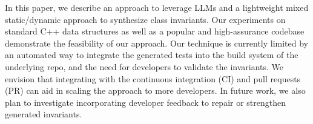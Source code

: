 In this paper, we describe an approach to leverage LLMs and a lightweight mixed static/dynamic approach to synthesize class invariants. 
Our experiments on standard C++ data structures as well as a popular and high-assurance codebase demonstrate the feasibility of our approach.
Our technique is currently limited by an automated way to integrate the generated tests into the build system of the underlying repo, and the need for developers to validate the invariants.
We envision that integrating \tech with the continuous integration (CI) and pull requests (PR) can aid in scaling the approach to more developers.
In future work, we also plan to investigate incorporating developer feedback to repair or strengthen generated invariants. 
